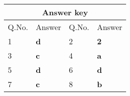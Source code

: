 \setlength\arrayrulewidth{1pt}
\begin{table}[H]
	\centering
	
	\begin{tabular}{|p{1.5cm}|p{1.5cm}||p{1.5cm}|p{1.5cm}|}
		\hline
		\multicolumn{4}{|c|}{\textbf{Answer key}}\\\hline\hline
		\rowcolor{ocrel}Q.No.&Answer&Q.No.&Answer\\\hline
		1&\textbf{d}&2&\textbf{2}\\\hline
		3&\textbf{c}&4&\textbf{a}\\\hline
		5&\textbf{d}&6&\textbf{d}\\\hline
		7&\textbf{c}&8&\textbf{b}\\\hline
	\end{tabular}
\end{table}



